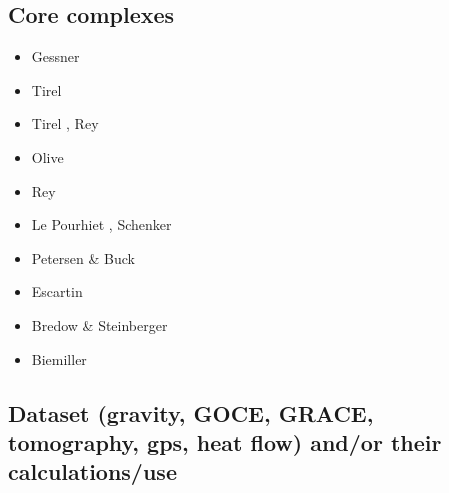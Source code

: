 \subsection{Core complexes}

\begin{scriptsize}
\begin{itemize}
\item[\twothousandseven] Gessner \etal \cite{gewm07}
\item[\twothousandeight] Tirel \etal \cite{tibb08}
\item[\twothousandnine] Tirel \etal \cite{tigv09}, Rey \etal \cite{retw09}
\item[\twothousandten] Olive \etal \cite{olbt10}
\item[\twothousandeleven] Rey \etal \cite{retk11}
\item[\twothousandtwelve] Le Pourhiet \etal \cite{lehm12}, Schenker \etal \cite{scgb12}
\item[\twothousandfifteen] Petersen \& Buck \cite{pebu15}
\item[\twothousandseventeen] Escartin \etal \cite{esmp17}
\item[\twothousandeighteen] Bredow \& Steinberger \cite{brst18}
\item[\twothousandnineteen] Biemiller \etal \cite{biem19}
\end{itemize}
\end{scriptsize}

\subsection{Dataset (gravity, GOCE, GRACE, tomography, gps, heat flow) 
and/or their calculations/use}


